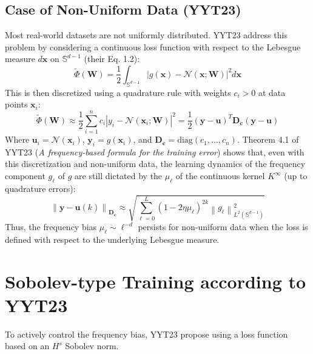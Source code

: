 \documentclass{article}
\begin{document}
\subsection{Case of Non-Uniform Data (YYT23)}
Most real-world datasets are not uniformly distributed. YYT23 address this problem by considering a continuous loss function with respect to the Lebesgue measure $d\mathbf{x}$ on $\mathbb{S}^{d-1}$ (their Eq. 1.2):
\begin{equation}
    \widetilde{\Phi}(\mathbf{W}) = \frac{1}{2}   \int_{\mathbb{S}^{d-1}}  | g(\mathbf{x}) - \mathcal{N}(\mathbf{x};\mathbf{W})|^2 d\mathbf{x}
\end{equation}
This is then discretized using a quadrature rule with weights $c_i > 0$ at data points $\mathbf{x}_i$:
\begin{equation}
    \widetilde{\Phi}(\mathbf{W}) \approx \frac{1}{2} \sum_{i=1}^n  c_i |y_i - \mathcal{N}(\mathbf{x}_i;\mathbf{W})|^2 = \frac{1}{2} (\mathbf{y} - \mathbf{u})^T \mathbf{D_c} (\mathbf{y} - \mathbf{u})
    \label{eq:loss_quadrature}
\end{equation}
Where $\mathbf{u}_i = \mathcal{N}(\mathbf{x}_i)$, $\mathbf{y}_i = g(\mathbf{x}_i)$, and $\mathbf{D_c} = \text{diag}(c_1, \dots, c_n)$.
Theorem 4.1 of YYT23 (\textit{A frequency-based formula for the training error}) shows that, even with this discretization and non-uniform data, the learning dynamics of the frequency component $g_\ell$ of $g$ are still dictated by the $\mu_\ell$ of the continuous kernel $K^{\infty}$ (up to quadrature errors):
\begin{equation}
    \left\lVert\mathbf{y} - \mathbf{u}(k) \right\rVert_{\mathbf{D_c}} \approx \sqrt{\sum_{\ell=0}^L (1-2\eta\mu_\ell)^{2k} \left\lVert g_\ell\right\rVert^2_{L^2(\mathbb{S}^{d-1})}}
\end{equation}
Thus, the frequency bias $\mu_\ell \sim \ell^{-d}$ persists for non-uniform data when the loss is defined with respect to the underlying Lebesgue measure.

\section{Sobolev-type Training according to YYT23}

To actively control the frequency bias, YYT23 propose using a loss function based on an $H^s$ Sobolev norm.
\end{document}
